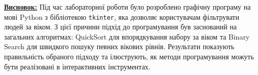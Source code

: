 \documentclass[12pt,a4paper]{article}
\begin{document}
    \textbf{\underline{Висновок:}}
    Під час лабораторної роботи  було розроблено графічну програму на мові Python з бібліотекою \texttt{tkinter}, яка дозволяє користувачам фільтрувати людей за віком. З цієї причини підхід до програмування був заснований на загальних алгоритмах: QuickSort для впорядкування набору за віком та Binary Search для швидкого пошуку певних вікових рівнів.
    Результати показують правильність обраного підходу та ілюструють, як методи програмування можуть бути реалізовані в інтерактивних інструментах.
\end{document}
